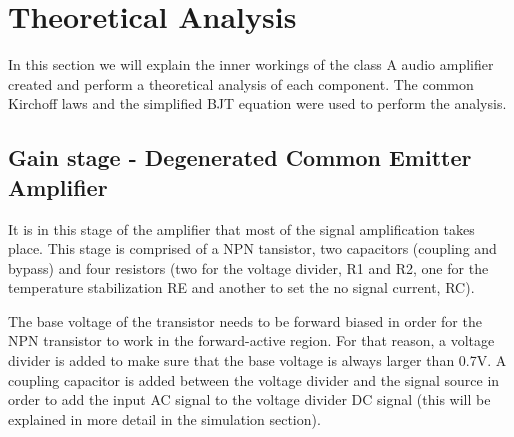 
\section{Theoretical Analysis}
\label{sec:analysis}



In this section we will explain the inner workings of the class A audio amplifier created and perform a theoretical analysis of each component. 
The common Kirchoff laws and the simplified BJT equation were used to perform the analysis.


\subsection{Gain stage - Degenerated Common Emitter Amplifier}
\label{subsec:transf}



It is in this stage of the amplifier that most of the signal amplification takes place. This stage is comprised of a NPN tansistor, two capacitors (coupling and bypass) and four resistors (two for the voltage divider, R1 and R2, one for the temperature stabilization RE and another to set the no signal current, RC).

The base voltage of the transistor needs to be forward biased in order for the NPN transistor to work in the forward-active region. For that reason, a voltage divider is added to make sure that the base voltage is always larger than 0.7V. A coupling capacitor is added between the voltage divider and the signal source in order to add the input AC signal to the voltage divider DC signal (this will be explained in more detail in the simulation section).

